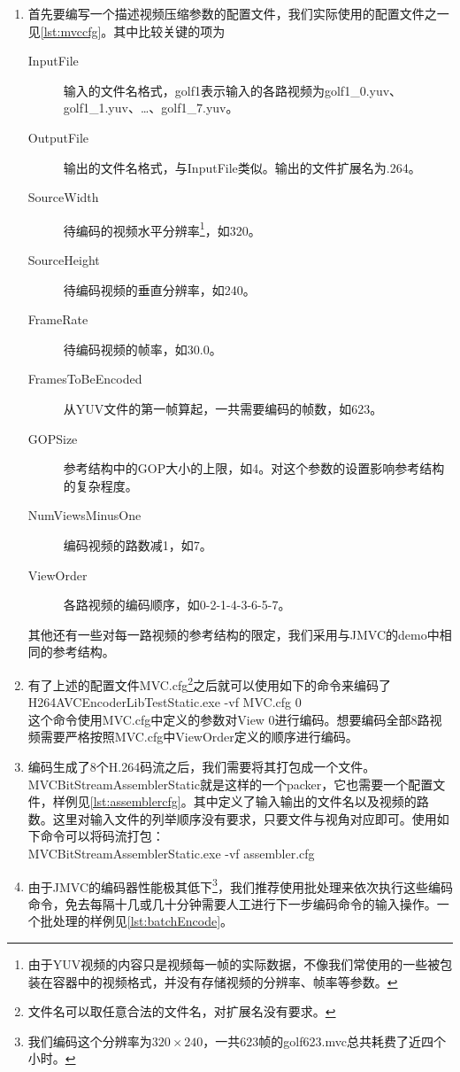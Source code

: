 \begin{enumerate}
\item 首先要编写一个描述视频压缩参数的配置文件，我们实际使用的配置文件之一见\autoref{lst:mvccfg}。其中比较关键的项为
\begin{description}
\item[InputFile] 输入的文件名格式，golf1表示输入的各路视频为golf1\_0.yuv、golf1\_1.yuv、\dots、golf1\_7.yuv。
\item[OutputFile] 输出的文件名格式，与InputFile类似。输出的文件扩展名为.264。
\item[SourceWidth] 待编码的视频水平分辨率\footnote{由于YUV视频的内容只是视频每一帧的实际数据，不像我们常使用的一些被包装在容器中的视频格式，并没有存储视频的分辨率、帧率等参数。}，如320。
\item[SourceHeight] 待编码视频的垂直分辨率，如240。
\item[FrameRate] 待编码视频的帧率，如30.0。
\item[FramesToBeEncoded] 从YUV文件的第一帧算起，一共需要编码的帧数，如623。
\item[GOPSize] 参考结构中的GOP大小的上限，如4。对这个参数的设置影响参考结构的复杂程度。
\item[NumViewsMinusOne] 编码视频的路数减1，如7。
\item[ViewOrder] 各路视频的编码顺序，如0-2-1-4-3-6-5-7。
\end{description}
其他还有一些对每一路视频的参考结构的限定，我们采用与JMVC的demo中相同的参考结构。
\item 有了上述的配置文件MVC.cfg\footnote{文件名可以取任意合法的文件名，对扩展名没有要求。}之后就可以使用如下的命令来编码了\\H264AVCEncoderLibTestStatic.exe -vf MVC.cfg 0\\这个命令使用MVC.cfg中定义的参数对View 0进行编码。想要编码全部8路视频需要严格按照MVC.cfg中ViewOrder定义的顺序进行编码。
\item 编码生成了8个H.264码流之后，我们需要将其打包成一个文件。MVCBitStreamAssemblerStatic就是这样的一个packer，它也需要一个配置文件，样例见\autoref{lst:assemblercfg}。其中定义了输入输出的文件名以及视频的路数。这里对输入文件的列举顺序没有要求，只要文件与视角对应即可。使用如下命令可以将码流打包：\\MVCBitStreamAssemblerStatic.exe -vf assembler.cfg
\item 由于JMVC的编码器性能极其低下\footnote{我们编码这个分辨率为$320\times 240$，一共623帧的golf623.mvc总共耗费了近四个小时。}，我们推荐使用批处理来依次执行这些编码命令，免去每隔十几或几十分钟需要人工进行下一步编码命令的输入操作。一个批处理的样例见\autoref{lst:batchEncode}。
\end{enumerate}

